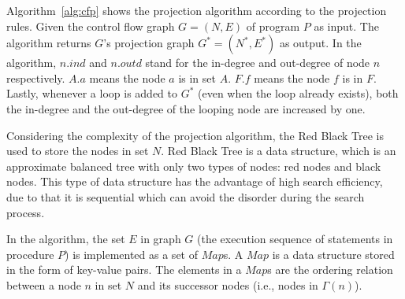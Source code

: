 Algorithm~\ref{alg:cfp} shows the projection algorithm according to the projection rules. %
%
Given the control flow graph $G = (N, E)$ of program $P$ as input. The algorithm returns $G$'s projection graph $G^*= (N^*, E^*)$ as output.
In the algorithm, $n.ind$ and $n.outd$ stand for the in-degree and out-degree of node $n$ respectively. $A.a$ means the node $a$ is in set $A$. $F.f$ means the node $f$ is in $F$. Lastly, whenever a loop is added to $G^*$ (even when the loop already exists), both the in-degree and the out-degree of the looping node are increased by one.

Considering the complexity of the projection algorithm, the Red Black Tree is used to store the nodes in set $N$. Red Black Tree is a data structure, which is an approximate balanced tree with only two types of nodes: red nodes and black nodes. This type of data structure has the advantage of high search efficiency, due to that it is sequential which can avoid the disorder during the search process. 

In the algorithm, the set $E$ in graph $G$ (the execution sequence of statements in procedure $P$) is implemented as a set of $Map$s. A $Map$ is a data structure stored in the form of key-value pairs. The elements in a $Map$s are the ordering relation between a node $n$ in set $N$ and its successor nodes (i.e., nodes in $\Gamma(n)$).

